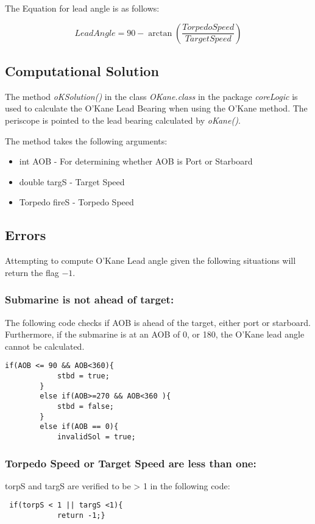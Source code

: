 \documentclass{article}
\begin{document}
The Equation for lead angle is as follows:

$$ LeadAngle = 90 - \arctan\left( \frac{Torpedo Speed}{TargetSpeed} \right) $$

\subsection{Computational Solution}
The method \emph{oKSolution()} in the class \emph{OKane.class} in the package \emph{coreLogic} is used to calculate the O'Kane Lead Bearing when using the O'Kane method. The periscope is pointed to the lead bearing calculated by \emph{oKane()}.

The method takes the following arguments:

\begin{itemize}
\item{int AOB - For determining whether AOB is Port or Starboard}
\item{double targS - Target Speed}
\item{Torpedo fireS - Torpedo Speed}
\end{itemize}

\subsection{Errors}

Attempting to compute O'Kane Lead angle given the following situations will return the flag \emph{$-1$}.

\subsubsection{Submarine is not ahead of target:}
The following code checks if AOB is ahead of the target, either port or starboard.
Furthermore, if the submarine is at an AOB of 0, or 180, the O'Kane lead angle cannot be calculated.
\begin{lstlisting}
if(AOB <= 90 && AOB<360){
            stbd = true;
        }
        else if(AOB>=270 && AOB<360 ){
            stbd = false;
        }
        else if(AOB == 0){
            invalidSol = true;
\end{lstlisting}

\subsubsection{Torpedo Speed or Target Speed are less than one:}
torpS and targS are verified to be > 1 in the following code:
\begin{lstlisting}
 if(torpS < 1 || targS <1){
            return -1;}
\end{lstlisting}
\end{document}
